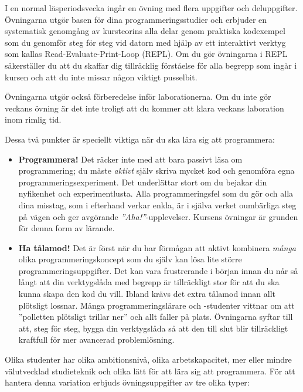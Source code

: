I en normal läsperiodsvecka ingår en övning med flera uppgifter och deluppgifter.
Övningarna utgör basen för dina programmeringsstudier och erbjuder en systematisk genomgång av kursteorins alla delar genom praktiska kodexempel som du genomför steg för steg vid datorn med hjälp av ett interaktivt verktyg som kallas Read-Evaluate-Print-Loop (REPL). Om du gör övningarna i REPL säkerställer du att du skaffar dig tillräcklig förståelse för alla begrepp som ingår i kursen och att du inte missar någon viktigt pusselbit.

Övningarna utgör också förberedelse inför laborationerna. Om du inte gör veckans övning är det inte troligt att du kommer att klara veckans laboration inom rimlig tid.

Dessa två punkter är speciellt viktiga när du ska lära sig att programmera:
\begin{itemize}
\item \textbf{Programmera!} Det räcker inte med att bara passivt läsa om programmering; du måste \emph{aktivt} själv skriva mycket kod och genomföra egna programmeringsexperiment. Det underlättar stort om du bejakar din nyfikenhet och experimentlusta. Alla programmeringsfel som du gör och alla dina misstag, som i efterhand verkar enkla, är i själva verket oumbärliga steg på vägen och ger avgörande \emph{''Aha!''}-upplevelser. Kursens övningar är grunden för denna form av lärande.

\item \textbf{Ha tålamod!} Det är först när du har förmågan att aktivt kombinera \emph{många} olika programmeringskoncept som du själv kan lösa lite större programmeringsuppgifter. Det kan vara frustrerande i början innan du når så långt att din verktygslåda med begrepp är tillräckligt stor för att du ska kunna skapa den kod du vill. Ibland krävs det extra tålamod innan allt plötsligt lossnar. Många programmeringslärare och -studenter vittnar om att ''polletten plötsligt trillar ner'' och allt faller på plats. Övningarna syftar till att, steg för steg, bygga din verktygslåda så att den till slut blir tillräckligt kraftfull för mer avancerad problemlösning.
\end{itemize}

Olika studenter har olika ambitionsnivå, olika arbetskapacitet, mer eller mindre välutvecklad studieteknik och olika lätt för att lära sig att programmera. För att hantera denna variation erbjuds övningsuppgifter av tre olika typer:

